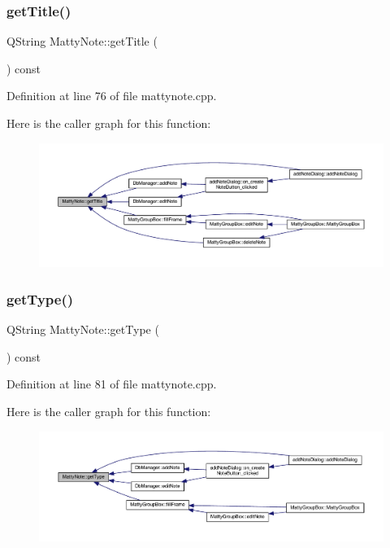 \subsubsection{\texorpdfstring{get\+Title()}{getTitle()}}
{\footnotesize\ttfamily Q\+String Matty\+Note\+::get\+Title (\begin{DoxyParamCaption}{ }\end{DoxyParamCaption}) const}



Definition at line 76 of file mattynote.\+cpp.

Here is the caller graph for this function\+:
\nopagebreak
\begin{figure}[H]
\begin{center}
\leavevmode
\includegraphics[width=350pt]{classMattyNote_a2205505ded709f404d995884a8d34c4a_icgraph}
\end{center}
\end{figure}
\hypertarget{classMattyNote_a882bd562d91b1d63ef6c982294b961d7}{}\label{classMattyNote_a882bd562d91b1d63ef6c982294b961d7} 
\subsubsection{\texorpdfstring{get\+Type()}{getType()}}
{\footnotesize\ttfamily Q\+String Matty\+Note\+::get\+Type (\begin{DoxyParamCaption}{ }\end{DoxyParamCaption}) const}



Definition at line 81 of file mattynote.\+cpp.

Here is the caller graph for this function\+:
\nopagebreak
\begin{figure}[H]
\begin{center}
\leavevmode
\includegraphics[width=350pt]{classMattyNote_a882bd562d91b1d63ef6c982294b961d7_icgraph}
\end{center}
\end{figure}
\hypertarget{classMattyNote_ad12d2758099fe96bf596ef6a7ab4abc2}{}\label{classMattyNote_ad12d2758099fe96bf596ef6a7ab4abc2} 
